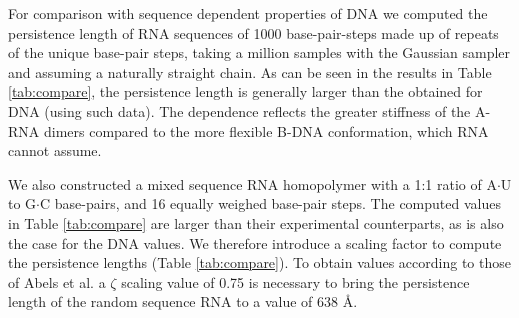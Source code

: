 For comparison  with sequence dependent properties of  DNA we computed
the persistence  length of RNA sequences of  1000 base-pair-steps made
up of repeats of the  unique base-pair steps, taking a million samples
with the Gaussian sampler and  assuming a naturally straight chain. As
can be seen in the results in Table \ref{tab:compare}, the persistence
length  is generally  larger than  the  obtained for  DNA (using  such
data).   The dependence reflects  the greater  stiffness of  the A-RNA
dimers  compared to the  more flexible  B-DNA conformation,  which RNA
cannot assume.

We also constructed a mixed  sequence RNA homopolymer with a 1:1 ratio
of A$\cdot$U to G$\cdot$C base-pairs, and 16 equally weighed base-pair
steps. The computed values  in Table \ref{tab:compare} are larger than
their  experimental counterparts,  as is  also  the case  for the  DNA
values.   We  therefore introduce  a  scaling  factor  to compute  the
persistence  lengths  (Table   \ref{tab:compare}).  To  obtain  values
according to those of Abels et  al. a $\zeta$ scaling value of 0.75 is
necessary to bring  the persistence length of the  random sequence RNA
to a value of 638 \AA.

